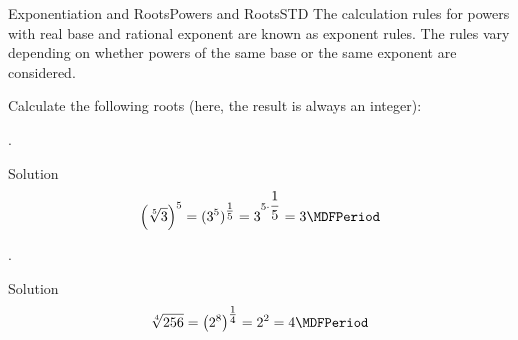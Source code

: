 \begin{MXContent}{Exponentiation and Roots}{Powers and Roots}{STD}
The calculation rules for powers with real base and rational exponent are known as exponent rules. The rules vary depending on 
whether powers of the same base or the same exponent are considered.

\begin{MExercise}
Calculate the following roots (here, the result is always an integer):
\begin{MExerciseItems}
\item{.\\\begin{MHint}{Solution} $$\left(\sqrt[5]{3}\right)^5=(3^5)^{\Mtfrac15}=3^{5\cdot \Mdfrac15}=3 \MDFPeriod$$\end{MHint}}
\item{.\\\begin{MHint}{Solution} $$\sqrt[4]{256}=\left({2^8}\right)^{\Mtfrac14}=2^2=4 \MDFPeriod$$\end{MHint}}
\end{MExerciseItems}
\end{MExercise}

\end{MXContent}

